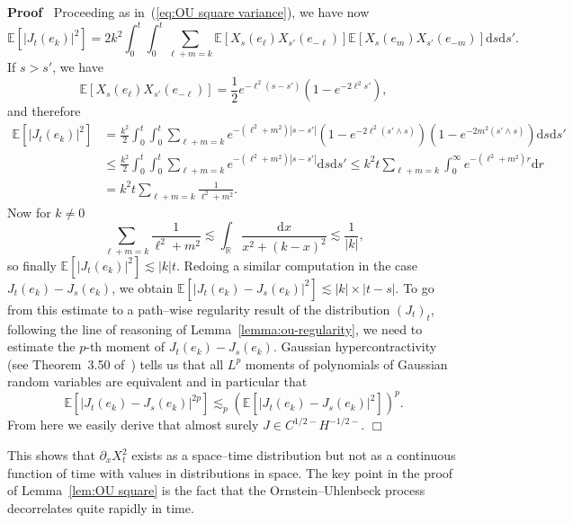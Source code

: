 \documentclass[a4paper,11pt]{article}
\newcommand{\mathd}{\mathrm{d}}
\newenvironment{proof}{\noindent\textbf{Proof\ }}{\hspace*{\fill}$\Box$\medskip}
\begin{document}
\begin{proof}
  Proceeding as in~(\ref{eq:OU square variance}), we have now
  \[ \mathbb{E} [| J_t (e_k) |^2] = 2 k^2 \int_0^t \int_0^t \sum_{\ell + m =
     k} \mathbb{E} [X_s (e_{\ell}) X_{s'} (e_{- \ell})] \mathbb{E} [X_s
     (e_m) X_{s'} (e_{- m})] \mathd s \mathd s' . \]
  If $s > s'$, we have
  \[ \mathbb{E} [X_s (e_{\ell}) X_{s'} (e_{- \ell})] = \frac{1}{2} e^{-
     \ell^2 (s - s')} (1 - e^{- 2 \ell^2 s'}), \]
  and therefore
  \begin{align*}
     \mathbb{E} [| J_t (e_k) |^2] & = \frac{k^2}{2} \int_0^t \int_0^t \sum_{\ell + m = k} e^{- (\ell^2 + m^2) | s - s' |} (1 - e^{- 2 \ell^2(s' \wedge s)}) (1 - e^{- 2 m^2 (s' \wedge s)}) \mathd s \mathd s' \\
      & \leqslant \frac{k^2}{2} \int_0^t \int_0^t \sum_{\ell + m = k} e^{-(\ell^2 + m^2) | s - s' |} \mathd s \mathd s' \leqslant k^2 t \sum_{\ell + m = k} \int_0^{\infty} e^{- (\ell^2 + m^2) r} \mathd r  \\
      & = k^2 t \sum_{\ell + m = k} \frac{1}{\ell^2 + m^2}.
  \end{align*}
  Now for $k \neq 0$
  \[ \sum_{\ell + m = k} \frac{1}{\ell^2 + m^2} \lesssim \int_{\mathbb{R}}
     \frac{\mathd x}{x^2 + (k - x)^2} \lesssim \frac{1}{| k |}, \]
  so finally $\mathbb{E} [| J_t (e_k) |^2] \lesssim | k | t$. Redoing a
  similar computation in the case $J_t (e_k) - J_s (e_k)$, we obtain
  $\mathbb{E} [| J_t (e_k) - J_s (e_k) |^2] \lesssim | k | \times | t - s |$.
  To go from this estimate to a path--wise regularity result of the
  distribution $(J_t)_t$, following the line of reasoning of
  Lemma~\ref{lemma:ou-regularity}, we need to estimate the $p$-th moment of
  $J_t (e_k) - J_s (e_k)$. Gaussian hypercontractivity (see Theorem~3.50
  of~{\cite{Janson1997}}) tells us that all $L^p$ moments of polynomials of
  Gaussian random variables are equivalent and in particular that
  \[ \mathbb{E} [| J_t (e_k) - J_s (e_k) |^{2 p}] \lesssim_p (\mathbb{E} [|
     J_t (e_k) - J_s (e_k) |^2])^p . \]
  From here we easily derive that almost surely $J \in C^{1 / 2 -} H^{- 1 / 2
  -}$.
\end{proof}

This shows that $\partial_x X^2_t$ exists as a space--time distribution but
not as a continuous function of time with values in distributions in space.
The key point in the proof of Lemma~\ref{lem:OU square} is the fact that the
Ornstein--Uhlenbeck process decorrelates quite rapidly in time.

\
\end{document}
